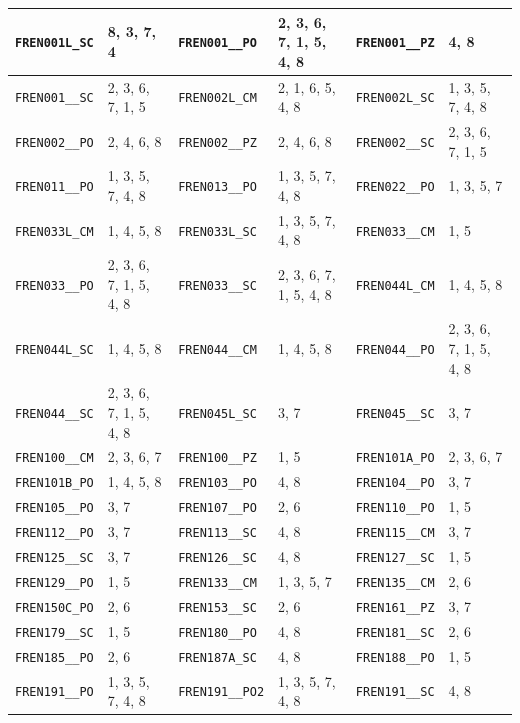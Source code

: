 \begin{longtable}{|l|l||l|l||l|l|}
    \verb|FREN001L_SC| & 8, 3, 7, 4 & \verb|FREN001__PO| & 2, 3, 6, 7, 1, 5, 4, 8 & \verb|FREN001__PZ| & 4, 8\\\hline
    \verb|FREN001__SC| & 2, 3, 6, 7, 1, 5 & \verb|FREN002L_CM| & 2, 1, 6, 5, 4, 8 & \verb|FREN002L_SC| & 1, 3, 5, 7, 4, 8\\\hline
    \verb|FREN002__PO| & 2, 4, 6, 8 & \verb|FREN002__PZ| & 2, 4, 6, 8 & \verb|FREN002__SC| & 2, 3, 6, 7, 1, 5\\\hline
    \verb|FREN011__PO| & 1, 3, 5, 7, 4, 8 & \verb|FREN013__PO| & 1, 3, 5, 7, 4, 8 & \verb|FREN022__PO| & 1, 3, 5, 7\\\hline
    \verb|FREN033L_CM| & 1, 4, 5, 8 & \verb|FREN033L_SC| & 1, 3, 5, 7, 4, 8 & \verb|FREN033__CM| & 1, 5\\\hline
    \verb|FREN033__PO| & 2, 3, 6, 7, 1, 5, 4, 8 & \verb|FREN033__SC| & 2, 3, 6, 7, 1, 5, 4, 8 & \verb|FREN044L_CM| & 1, 4, 5, 8\\\hline
    \verb|FREN044L_SC| & 1, 4, 5, 8 & \verb|FREN044__CM| & 1, 4, 5, 8 & \verb|FREN044__PO| & 2, 3, 6, 7, 1, 5, 4, 8\\\hline
    \verb|FREN044__SC| & 2, 3, 6, 7, 1, 5, 4, 8 & \verb|FREN045L_SC| & 3, 7 & \verb|FREN045__SC| & 3, 7\\\hline
    \verb|FREN100__CM| & 2, 3, 6, 7 & \verb|FREN100__PZ| & 1, 5 & \verb|FREN101A_PO| & 2, 3, 6, 7\\\hline
    \verb|FREN101B_PO| & 1, 4, 5, 8 & \verb|FREN103__PO| & 4, 8 & \verb|FREN104__PO| & 3, 7\\\hline
    \verb|FREN105__PO| & 3, 7 & \verb|FREN107__PO| & 2, 6 & \verb|FREN110__PO| & 1, 5\\\hline
    \verb|FREN112__PO| & 3, 7 & \verb|FREN113__SC| & 4, 8 & \verb|FREN115__CM| & 3, 7\\\hline
    \verb|FREN125__SC| & 3, 7 & \verb|FREN126__SC| & 4, 8 & \verb|FREN127__SC| & 1, 5\\\hline
    \verb|FREN129__PO| & 1, 5 & \verb|FREN133__CM| & 1, 3, 5, 7 & \verb|FREN135__CM| & 2, 6\\\hline
    \verb|FREN150C_PO| & 2, 6 & \verb|FREN153__SC| & 2, 6 & \verb|FREN161__PZ| & 3, 7\\\hline
    \verb|FREN179__SC| & 1, 5 & \verb|FREN180__PO| & 4, 8 & \verb|FREN181__SC| & 2, 6\\\hline
    \verb|FREN185__PO| & 2, 6 & \verb|FREN187A_SC| & 4, 8 & \verb|FREN188__PO| & 1, 5\\\hline
    \verb|FREN191__PO| & 1, 3, 5, 7, 4, 8 & \verb|FREN191__PO2| & 1, 3, 5, 7, 4, 8 & \verb|FREN191__SC| & 4, 8\\\hline

\end{longtable}
